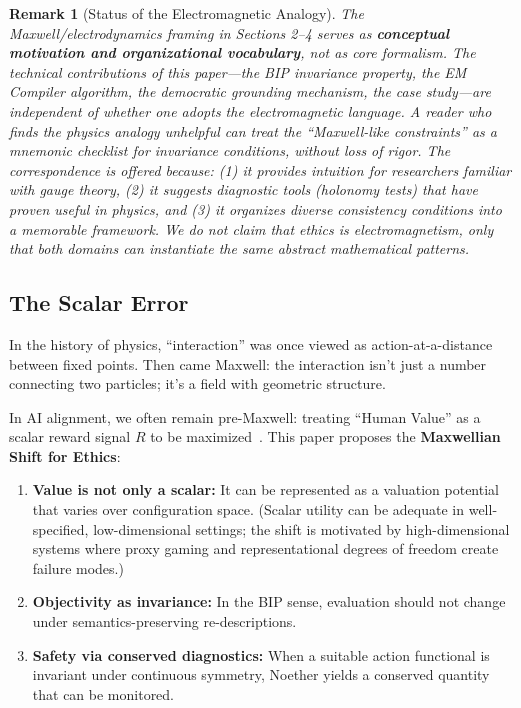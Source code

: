 \documentclass[12pt]{article}
\newtheorem{remark}[theorem]{Remark}
\begin{document}
\begin{remark}[Status of the Electromagnetic Analogy]
\emph{The Maxwell/electrodynamics framing in
Sections 2--4 serves as \textbf{conceptual motivation and organizational vocabulary}, not as core
formalism. The technical contributions of this paper---the BIP invariance property, the EM Compiler algorithm, the democratic grounding mechanism, the case study---are independent of whether
one adopts the electromagnetic language. A reader who finds the physics analogy unhelpful can
treat the ``Maxwell-like constraints'' as a mnemonic checklist for invariance conditions, without loss
of rigor. The correspondence is offered because: (1) it provides intuition for researchers familiar with gauge theory, (2) it suggests diagnostic tools (holonomy tests) that have proven useful in
physics, and (3) it organizes diverse consistency conditions into a memorable framework. We do
not claim that ethics \emph{is} electromagnetism, only that both domains can instantiate the same abstract
mathematical patterns.}
\end{remark}

\subsection{The Scalar Error}

In the history of physics, ``interaction'' was once viewed as action-at-a-distance between fixed points.
Then came Maxwell: the interaction isn't just a number connecting two particles; it's a field with
geometric structure.

In AI alignment, we often remain pre-Maxwell: treating ``Human Value'' as a scalar reward
signal $R$ to be maximized~\cite{russell2019,amodei2016}. This paper proposes the \textbf{Maxwellian Shift for Ethics}:

\begin{enumerate}
\item \textbf{Value is not only a scalar:} It can be represented as a valuation potential that varies over
configuration space. (Scalar utility can be adequate in well-specified, low-dimensional settings;
the shift is motivated by high-dimensional systems where proxy gaming and representational
degrees of freedom create failure modes.)
\item \textbf{Objectivity as invariance:} In the BIP sense, evaluation should not change under semantics-preserving re-descriptions.
\item \textbf{Safety via conserved diagnostics:} When a suitable action functional is invariant under
continuous symmetry, Noether yields a conserved quantity that can be monitored.
\end{enumerate}
\end{document}

